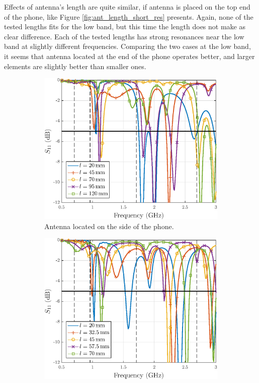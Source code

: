 Effects of antenna's length are quite similar, if antenna is placed on the top end of the phone, like Figure \ref{fig:ant_length_short_res} presents. Again, none of the tested lengths fits for the low band, but this time the length does not make as clear difference. Each of the tested lengths has strong resonances near the low band at slightly different frequencies. Comparing the two cases at the low band, it seems that antenna located at the end of the phone operates better, and larger elements are slightly better than smaller ones.
\begin{figure}[H]
    \centering
    \begin{subfigure}[b]{0.49\textwidth}
        \includegraphics[width=\textwidth]{img/ant_length_long_res.eps}
        \caption{Antenna located on the side of the phone.}
        \label{fig:ant_length_long_res}
    \end{subfigure}
    \begin{subfigure}[b]{0.49\textwidth}
        \includegraphics[width=\textwidth]{img/ant_length_short_res.eps}

\end{subfigure}
\end{figure}
